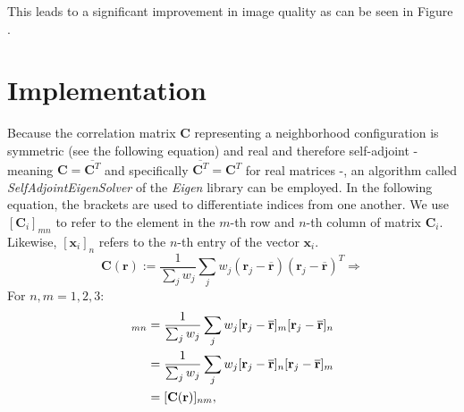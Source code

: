 This leads to a significant improvement in image quality as can be seen in Figure .



\section{Implementation}
\label{sec:particleneighborhood:implementation}

Because the correlation matrix $\textbf{C}$ representing a neighborhood configuration is symmetric (see the following equation) and real and therefore self-adjoint - meaning $\textbf{C} = \overline{\textbf{C}^T}$ and specifically $\overline{\textbf{C}^T} = \textbf{C}^T$ for real matrices -, an algorithm called \mbox{\textit{SelfAdjointEigenSolver}} of the \textit{Eigen} library can be employed.
In the following equation, the brackets are used to differentiate indices from one another. We use $[\textbf{C}_i]_{mn}$ to refer to the element in the $m$-th row and $n$-th column of matrix $\textbf{C}_i$. Likewise, $[\textbf{x}_i]_n$ refers to the $n$-th entry of the vector $\textbf{x}_i$.
\[
\textbf{C}(\textbf{r}) :=
\frac{1}{\sum_j w_{j}}
\sum_j w_j (\textbf{r}_j - \overline{\textbf{r}}) (\textbf{r}_j - \overline{\textbf{r}})^T
\Rightarrow
\]
For $n,m = 1, 2, 3$:
\begin{align*}
[\textbf{C}(\textbf{r})]_{mn} &=
\frac{1}{\sum_j w_j} \sum_j w_j \space [\textbf{r}_j - \overline{\textbf{r}}]_m \space [\textbf{r}_j - \overline{\textbf{r}}]_n
\\ &=
\frac{1}{\sum_j w_j} \sum_j w_j \space [\textbf{r}_j - \overline{\textbf{r}}]_n \space [\textbf{r}_j - \overline{\textbf{r}}]_m
\\ &=
[\textbf{C}(\textbf{r})]_{nm}
,
\end{align*}

